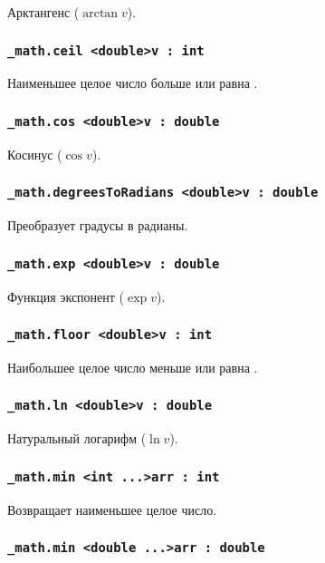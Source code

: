 \documentclass[a4paper, 14pt]{extarticle}
\begin{document}
Арктангенс ($\arctan{v}$).

\subsubsection{\lstinline|_math.ceil <double>v : int|}

Наименьшее целое число больше или равна .

\subsubsection{\lstinline|_math.cos <double>v : double|}

Косинус ($\cos{v}$).

\subsubsection{\lstinline|_math.degreesToRadians <double>v : double|}

Преобразует градусы в радианы.

\subsubsection{\lstinline|_math.exp <double>v : double|}

Функция экспонент ($\exp{v}$).

\subsubsection{\lstinline|_math.floor <double>v : int|}

Наибольшее целое число меньше или равна .

\subsubsection{\lstinline|_math.ln <double>v : double|}

Натуральный логарифм ($\ln{v}$).

\subsubsection{\lstinline|_math.min <int ...>arr : int|}

Возвращает наименьшее целое число.

\subsubsection{\lstinline|_math.min <double ...>arr : double|}
\end{document}
